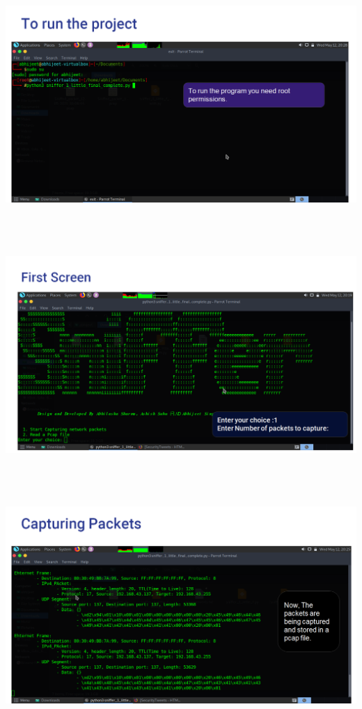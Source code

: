 \documentclass[12pt, a4paper]{report}
\begin{document}
\includegraphics[width=6.85666in,height=3.55507in]{Screenshot (10).png}

\includegraphics[width=6.85666in,height=3.55507in]{Screenshot (11).png}

\includegraphics[width=6.85666in,height=3.55507in]{Screenshot (12).png}
\end{document}
